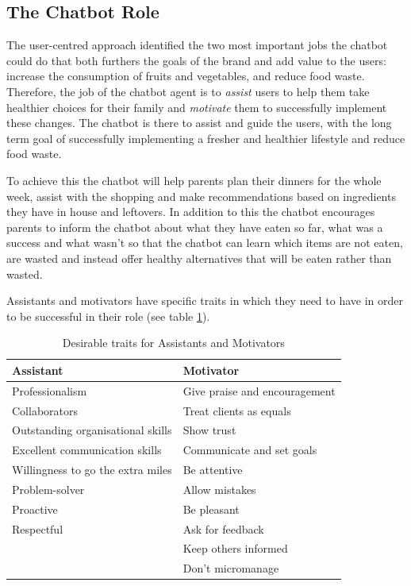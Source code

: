 \vspace{5mm}

    \subsection{The Chatbot Role}
    
    The user-centred approach identified the two most important jobs the chatbot could do that both furthers the goals of the brand and add value to the users: increase the consumption of fruits and vegetables, and reduce food waste. Therefore, the job of the chatbot agent is to \textit{assist} users to help them take healthier choices for their family and \textit{motivate} them to successfully implement these changes. The chatbot is there to assist and guide the users, with the long term goal of successfully implementing a fresher and healthier lifestyle and reduce food waste. 
    
    To achieve this the chatbot will help parents plan their dinners for the whole week, assist with the shopping and make recommendations based on ingredients they have in house and leftovers. In addition to this the chatbot encourages parents to inform the chatbot about what they have eaten so far, what was a success and what wasn’t so that the chatbot can learn which items are not eaten, are wasted and instead offer healthy alternatives that will be eaten rather than wasted. 
    
    Assistants and motivators have specific traits in which they need to have in order to be successful in their role (see table \ref{table:2}).
    
\vspace{2,5mm}

    \begin{table}[h]
    \begin{tabular}{ |p{}||p{}|  }
    \hline
    Assistant & Motivator \\
    \hline
        Professionalism & Give praise and encouragement \\
        Collaborators & Treat clients as equals \\
        Outstanding organisational skills & Show trust \\
        Excellent communication skills & Communicate and set goals \\
        Willingness to go the extra miles & Be attentive \\
        Problem-solver & Allow mistakes \\
        Proactive & Be pleasant \\
        Respectful & Ask for feedback \\
        & Keep others informed \\
        & Don’t micromanage \\
    \hline
    \end{tabular}
    \caption{Desirable traits for Assistants and Motivators}
    \label{table:2}
    \end{table}
 
